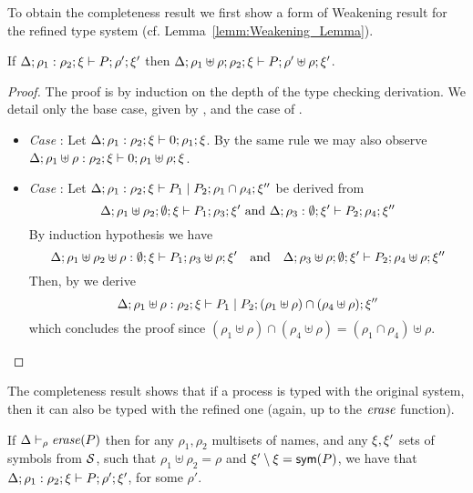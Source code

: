 To obtain the completeness result we first show a form of Weakening result for the refined type system (cf. Lemma~\ref{lemm:Weakening_Lemma}).

\begin{lemma}[%
Weakening]{\label{lemm:algorithmic_weakening}}%
If $\Delta; \rho_1: \rho_2; \xi \vdash P ; \rho'; \xi'$ then $\Delta; \rho_1\uplus\rho; \rho_2; \xi \vdash  P ; \rho'\uplus \rho; \xi'$.
\end{lemma}

\begin{proof}
The proof is by induction on the depth of the type checking derivation. We detail only the base case, given by , and the case of .
\begin{itemize}
\item
\emph{Case} : Let $\Delta; \rho_1: \rho_2; \xi \vdash 0 ; \rho_1; \xi$. By the same rule we may also observe $\Delta; \rho_1\uplus\rho: \rho_2; \xi \vdash 0 ; \rho_1\uplus \rho; \xi$.
%
%
\item
\emph{Case} :
Let $\Delta; \rho_1: \rho_2; \xi \vdash P_1 \;|\; P_2; \rho_1\cap \rho_4; \xi''$ be derived from 
\[
\Delta; \rho_1\uplus\rho_2; \emptyset; \xi \vdash P_1; \rho_3; \xi' \text{ and }  \Delta; \rho_3: \emptyset; \xi' \vdash P_2 ; \rho_4; \xi''
\]
By induction hypothesis we have 
\[
\Delta; \rho_1\uplus\rho_2\uplus\rho: \emptyset; \xi \vdash P_1 ; \rho_3\uplus \rho; \xi' \quad \mbox{and} \quad \Delta; \rho_3\uplus\rho; \emptyset; \xi' \vdash P_2; \rho_4\uplus\rho; \xi''
\]
Then, by  we derive 
\[
\Delta; \rho_1\uplus \rho: \rho_2; \xi \vdash P_1 \;|\; P_2; (\rho_1\uplus \rho)\cap (\rho_4 \uplus \rho); \xi''
\] 
which concludes the proof since $(\rho_1\uplus \rho)\cap (\rho_4 \uplus \rho)=(\rho_1\cap \rho_4)\uplus \rho$.
\end{itemize}
\end{proof}

The completeness result shows that if a process is typed with the original system, then it can also be typed with the refined one (again, up to the $\mathit{erase}$ function).

\begin{lemma}{\label{lemm:alogtithmic_completness}}

If $\Delta \vdash_\rho \mathit{erase}(P)$ then for any $\rho_1, \rho_2$ multisets of names, and any $\xi, \xi'$ sets of symbols from $\cal{S}$, such that $\rho_1\uplus\rho_2=\rho$ and %
$\xi'\setminus\xi=\mathsf{sym}(P)$, we have that $\Delta; \rho_1: \rho_2; \xi \vdash P; \rho'; \xi'$, for some $\rho'$.%
\end{lemma}

